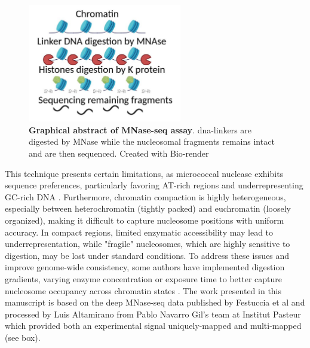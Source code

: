 \documentclass[11pt]{book}
\begin{document}
\begin{figure}
    \centering
    \includegraphics[width=0.6\textwidth]{Figures/Introduction/mnase_graphabstract.pdf}
    \caption{\textbf{Graphical abstract of MNase-seq assay}. \Gls{dna}-linkers are digested by MNase while the nucleosomal fragments remains intact and are then sequenced. Created with Bio-render}
    \label{fig:mnase_graphabstract}
\end{figure}

This technique presents certain limitations, as micrococcal nuclease exhibits sequence preferences, particularly favoring AT-rich regions and underrepresenting GC-rich DNA \cite{chungEffectMicrococcalNuclease2010}. Furthermore, chromatin compaction is highly heterogeneous, especially between heterochromatin (tightly packed) and euchromatin (loosely organized), making it difficult to capture nucleosome positions with uniform accuracy. In compact regions, limited enzymatic accessibility may lead to underrepresentation, while "fragile" nucleosomes, which are highly sensitive to digestion, may be lost under standard conditions. To address these issues and improve genome-wide consistency, some authors have implemented digestion gradients, varying enzyme concentration or exposure time to better capture nucleosome occupancy across chromatin states \cite{cherejiQuantitativeMNaseseqAccurately2019}.
The work presented in this manuscript is based on the deep MNase-seq data published by Festuccia et al and processed by Luis Altamirano from Pablo Navarro Gil's team at Institut Pasteur \cite{festuccia_transcription_2019} which provided both an experimental signal uniquely-mapped and multi-mapped (see box).
\end{document}
